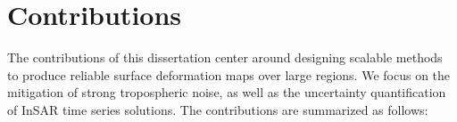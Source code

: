 


\section{Contributions}
\label{sec:chap1-contributions}


The contributions of this dissertation center around designing scalable methods to produce reliable surface deformation maps over large regions. We focus on the mitigation of strong tropospheric noise, as well as the uncertainty quantification of InSAR time series solutions. The contributions are summarized as follows:

